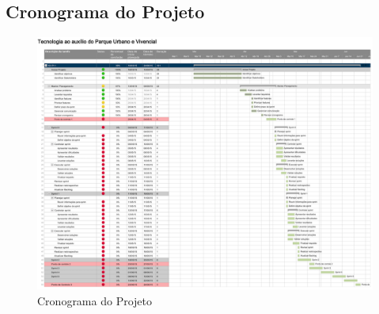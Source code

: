 \begin{anexosenv}

\partanexos

\chapter{Cronograma do Projeto}

\begin{figure}[h]
       \centering
	\label{CronogramaDoProjeto}
		\includegraphics[keepaspectratio=true,scale=0.8,angle=270]{figuras/CronogramaProjeto.png}
	\caption{Cronograma do Projeto}
\end{figure}

\end{anexosenv}